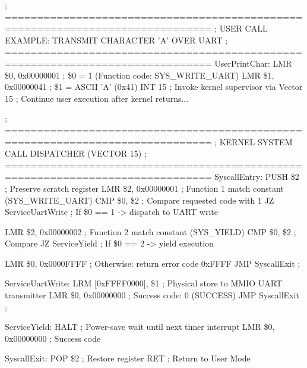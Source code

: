 \documentclass[11pt,a4paper]{article}
\newcommand{\reg}{\$}
\begin{document}
\begin{examplebox}[title={Listing: Operating System Syscall Dispatcher (syscall.asm)},top=3pt,bottom=3pt,unbreakable]
\begin{limasm}
; ==============================================================================
; USER CALL EXAMPLE: TRANSMIT CHARACTER 'A' OVER UART
; ==============================================================================
UserPrintChar:
    LMR         \reg0, 0x00000001           ; \reg0 = 1 (Function code: SYS_WRITE_UART)
    LMR         \reg1, 0x00000041           ; \reg1 = ASCII 'A' (0x41)
    INT         15                          ; Invoke kernel supervisor via Vector 15
    ; Continue user execution after kernel returns...

; ==============================================================================
; KERNEL SYSTEM CALL DISPATCHER (VECTOR 15)
; ==============================================================================
SyscallEntry:
    PUSH        \reg2                       ; Preserve scratch register
    LMR         \reg2, 0x00000001           ; Function 1 match constant (SYS_WRITE_UART)
    CMP         \reg0, \reg2                ; Compare requested code with 1
    JZ          ServiceUartWrite            ; If \reg0 == 1 -> dispatch to UART write

    LMR         \reg2, 0x00000002           ; Function 2 match constant (SYS_YIELD)
    CMP         \reg0, \reg2                ; Compare
    JZ          ServiceYield                ; If \reg0 == 2 -> yield execution

    LMR         \reg0, 0x0000FFFF           ; Otherwise: return error code 0xFFFF
    JMP         SyscallExit                 ;

ServiceUartWrite:
    LRM         [0xFFFF0000], \reg1         ; Physical store to MMIO UART transmitter
    LMR         \reg0, 0x00000000           ; Success code: 0 (SUCCESS)
    JMP         SyscallExit                 ;

ServiceYield:
    HALT                                    ; Power-save wait until next timer interrupt
    LMR         \reg0, 0x00000000           ; Success code

SyscallExit:
    POP         \reg2                       ; Restore register
    RET                                     ; Return to User Mode
\end{limasm}
\end{examplebox}

\clearpage
\end{document}
